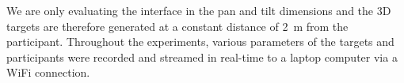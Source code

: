 \documentclass[sigconf, screen=true, anonymous=true]{acmart}
\begin{document}
We are only evaluating the interface in the pan and tilt dimensions and the 3D targets are therefore generated at a constant distance of \SI{2}{\metre} from the participant.
Throughout the experiments, various parameters of the targets and participants were recorded and streamed in real-time to a laptop computer via a WiFi connection.




\end{document}
